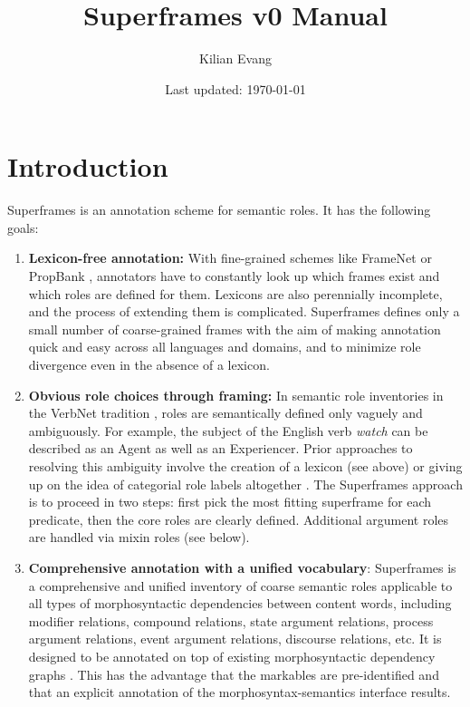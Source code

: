\documentclass[a4paper]{article}
\title{Superframes v0 Manual}
\author{Kilian Evang}
\date{Last updated: \today}
\begin{document}
\maketitle

\tableofcontents

\clearpage
\section{Introduction}

Superframes is an annotation scheme for semantic roles. It has the following goals:

\begin{enumerate}
    \item \textbf{Lexicon-free annotation:} With fine-grained schemes like FrameNet \citep{baker-etal-1998-berkeley-framenet} or PropBank \citep{palmer-etal-2005-proposition}, annotators have to constantly look up which frames exist and which roles are defined for them. Lexicons are also perennially incomplete, and the process of extending them is complicated. Superframes defines only a small number of coarse-grained frames with the aim of making annotation quick and easy across all languages and domains, and to minimize role divergence even in the absence of a lexicon.
    \item \textbf{Obvious role choices through framing:} In semantic role inventories in the VerbNet tradition \citep{kipper-schuler-2005-verbnet}, roles are semantically defined only vaguely and ambiguously. For example, the subject of the English verb \emph{watch} can be described as an Agent as well as an Experiencer. Prior approaches to resolving this ambiguity involve the creation of a lexicon (see above) or giving up on the idea of categorial role labels altogether \citep{white-etal-2016-universal}. The Superframes approach is to proceed in two steps: first pick the most fitting superframe for each predicate, then the core roles are clearly defined. Additional argument roles are handled via mixin roles (see below).
    \item \textbf{Comprehensive annotation with a unified vocabulary}: Superframes is a comprehensive and unified inventory of coarse semantic roles applicable to all types of morphosyntactic dependencies between content words, including modifier relations, compound relations, state argument relations, process argument relations, event argument relations, discourse relations, etc. It is designed to be annotated on top of existing morphosyntactic dependency graphs \citep[e.g., Universal Dependencies; ][]{de-marneffe-etal-2021-universal}. This has the advantage that the markables are pre-identified and that an explicit annotation of the morphosyntax-semantics interface results.

\end{enumerate}
\end{document}
